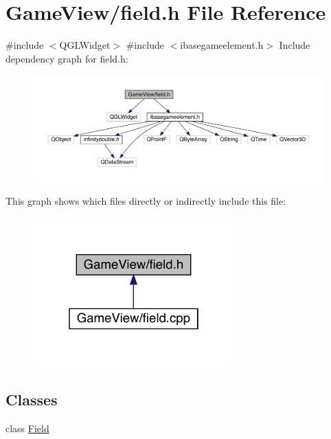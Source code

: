 \hypertarget{a00074}{}\section{Game\+View/field.h File Reference}
\label{a00074}
{\ttfamily \#include $<$Q\+G\+L\+Widget$>$}\newline
{\ttfamily \#include $<$ibasegameelement.\+h$>$}\newline
Include dependency graph for field.\+h\+:
\nopagebreak
\begin{figure}[H]
\begin{center}
\leavevmode
\includegraphics[width=350pt]{d9/da5/a00075}
\end{center}
\end{figure}
This graph shows which files directly or indirectly include this file\+:
\nopagebreak
\begin{figure}[H]
\begin{center}
\leavevmode
\includegraphics[width=220pt]{db/df8/a00076}
\end{center}
\end{figure}
\subsection*{Classes}
\begin{DoxyCompactItemize}
\item 
class \hyperlink{a00173}{Field}
\end{DoxyCompactItemize}
